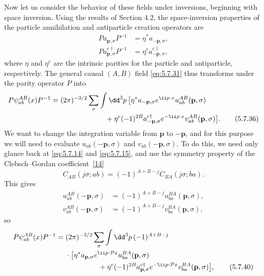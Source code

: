Now let us consider the behavior of these fields under inversions, beginning
with space inversion. Using the results of Section 4.2, the space-inversion
properties of the particle annihilation and antiparticle creation operators
are
\begin{align}
P a_{\mathbf p,\sigma}P^{-1}&=\eta^*a_{-\mathbf p,\sigma},
\tag{5.7.34}\label{eq:5.7.34}\\
P a^{c\dagger}_{\mathbf p,\sigma}P^{-1}&=\eta^c
a^{c\dagger}_{-\mathbf p,\sigma},
\tag{5.7.35}\label{eq:5.7.35}
\end{align}
where $\eta$ and $\eta^c$ are the intrinsic parities for the particle and
antiparticle, respectively. The general causal $(A,B)$ field \eqref{eq:5.7.31} thus
transforms under the parity operator $P$ into
\begin{align}
P\psi^{AB}_{ab}(x)P^{-1}={}&(2\pi)^{-3/2}\sum_\sigma\int \dd^3p\,
\bigl[\eta^*a_{-\mathbf p,\sigma}e^{\ii p\cdot x}u^{AB}_{ab}(\mathbf p,\sigma)
\notag\\
&\hspace{22mm}+\eta^c(-1)^{2B}a^{c\dagger}_{-\mathbf p,\sigma}e^{-\ii p\cdot x}
v^{AB}_{ab}(\mathbf p,\sigma)\bigr].
\tag{5.7.36}\label{eq:5.7.36}
\end{align}
We want to change the integration variable from $\mathbf p$ to $-\mathbf p$,
and for this purpose we will need to evaluate $u_{ab}(-\mathbf p,\sigma)$ and
$v_{ab}(-\mathbf p,\sigma)$. To do this, we need only glance back at \eqref{eq:5.7.14}
and \eqref{eq:5.7.15}, and use the symmetry property of the Clebsch--Gordan
coefficient~\hyperref[ref:5.14]{[14]}
\begin{equation}
C_{AB}(j\sigma;ab)=(-1)^{A+B-j}C_{BA}(j\sigma;ba).
\tag{5.7.37}\label{eq:5.7.37}
\end{equation}
This gives
\begin{align}
u^{AB}_{ab}(-\mathbf p,\sigma)&=(-1)^{A+B-j}u^{BA}_{ba}(\mathbf p,\sigma),
\tag{5.7.38}\label{eq:5.7.38}\\
v^{AB}_{ab}(-\mathbf p,\sigma)&=(-1)^{A+B-j}v^{BA}_{ba}(\mathbf p,\sigma),
\tag{5.7.39}\label{eq:5.7.39}
\end{align}
so
\begin{align}
P\psi^{AB}_{ab}(x)P^{-1}={}&(2\pi)^{-3/2}\sum_\sigma\int \dd^3p\,
(-1)^{A+B-j}
\notag\\
&\cdot\bigl[\eta^*a_{\mathbf p,\sigma}e^{\ii p\cdot\mathcal P x}
u^{BA}_{ba}(\mathbf p,\sigma)
\notag\\
&\hspace{16mm}+\eta^c(-1)^{2B}a^{c\dagger}_{\mathbf p,\sigma}
e^{-\ii p\cdot\mathcal P x}v^{BA}_{ba}(\mathbf p,\sigma)\bigr],
\tag{5.7.40}\label{eq:5.7.40}
\end{align}
